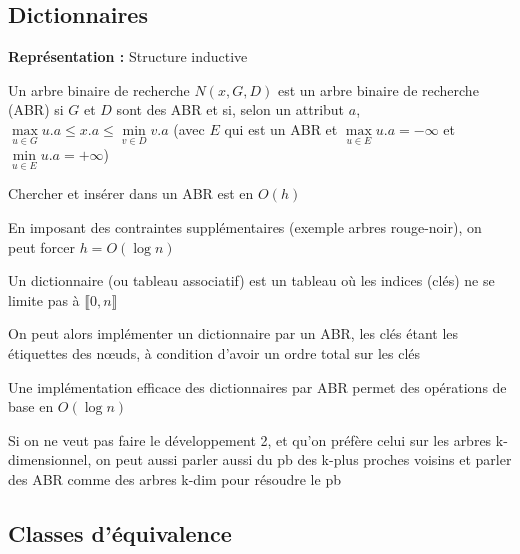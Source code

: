 \subsection{Dictionnaires}

\noindent \textbf{Représentation :} Structure inductive

\begin{definition}
	Un arbre binaire de recherche $N(x, G, D)$ est un arbre binaire de recherche (ABR) si $G$ et $D$ sont des ABR et si, selon un attribut $a$, $\max\limits_{u\in G} u.a\leq x.a \leq \min\limits_{v\in D} v.a$ (avec $E$ qui est un ABR et $\max\limits_{u\in E} u.a = -\infty$ et $\min\limits_{u \in E} u.a = +\infty$)
\end{definition}

\begin{proposition}
	Chercher et insérer dans un ABR est en $O(h)$
\end{proposition}

\begin{proposition}
	En imposant des contraintes supplémentaires (exemple arbres rouge-noir), on peut forcer $h = O(\log n)$
\end{proposition}

\begin{definition}
	Un dictionnaire (ou tableau associatif) est un tableau où les indices (clés) ne se limite pas à $\llbracket 0, n\rrbracket$
\end{definition}

\begin{idee}
	On peut alors implémenter un dictionnaire par un ABR, les clés étant les étiquettes des nœuds, à condition d'avoir un ordre total sur les clés
\end{idee}

\begin{theorem}
	Une implémentation efficace des dictionnaires par ABR permet des opérations de base en $O(\log n)$
\end{theorem}

\begin{com}
	Si on ne veut pas faire le développement 2, et qu'on préfère celui sur les arbres k-dimensionnel, on peut aussi parler aussi du pb des k-plus proches voisins et parler des ABR comme des arbres k-dim pour résoudre le pb
\end{com}

\subsection{Classes d'équivalence}

